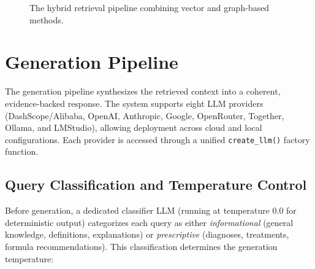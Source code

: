 \begin{figure}[H]
{}
    \caption{The hybrid retrieval pipeline combining vector and graph-based methods.}
    \label{fig:retrieval_flow}
\end{figure}

\section{Generation Pipeline}

The generation pipeline synthesizes the retrieved context into a coherent, evidence-backed response. The system supports eight LLM providers (DashScope/Alibaba, OpenAI, Anthropic, Google, OpenRouter, Together, Ollama, and LMStudio), allowing deployment across cloud and local configurations. Each provider is accessed through a unified \texttt{create\_llm()} factory function.

\subsection{Query Classification and Temperature Control}

Before generation, a dedicated classifier LLM (running at temperature 0.0 for deterministic output) categorizes each query as either \textit{informational} (general knowledge, definitions, explanations) or \textit{prescriptive} (diagnoses, treatments, formula recommendations). This classification determines the generation temperature:


